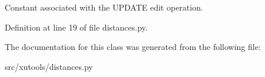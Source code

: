 Constant associated with the U\-P\-D\-A\-T\-E edit operation. 



Definition at line 19 of file distances.\-py.



The documentation for this class was generated from the following file\-:\begin{DoxyCompactItemize}
\item 
src/xutools/distances.\-py\end{DoxyCompactItemize}
